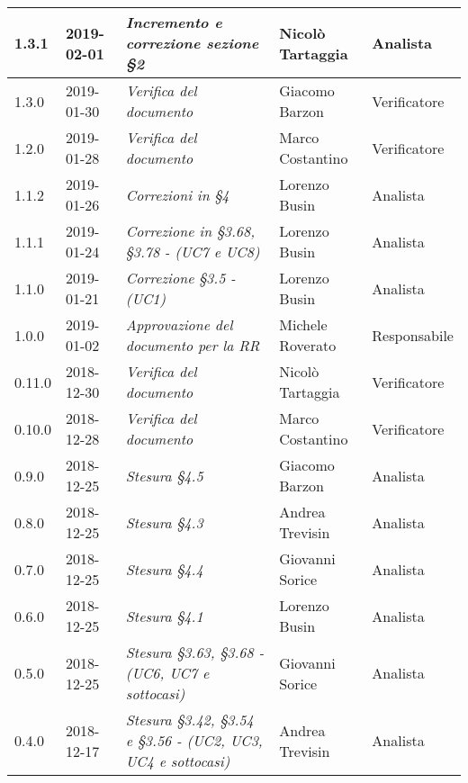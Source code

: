 \begin{longtable}{C{2cm}|C{2.5cm}|C{4.5cm}|C{2.5cm}|C{3cm}}
		1.3.1 & 2019-02-01 & \emph{Incremento e correzione sezione §2} & Nicolò Tartaggia & Analista \\
		\hline
	
		1.3.0 & 2019-01-30 & \emph{Verifica del documento} & Giacomo Barzon & Verificatore \\
		\hline
		
		1.2.0 & 2019-01-28 & \emph{Verifica del documento} & Marco Costantino & Verificatore \\
		\hline
	
		1.1.2 & 2019-01-26 & \emph{Correzioni in §4} & Lorenzo Busin & Analista \\
		\hline
	
		1.1.1 & 2019-01-24 & \emph{Correzione in §3.68, §3.78 - (UC7 e UC8)} & Lorenzo Busin & Analista \\
		\hline	
	
		1.1.0 & 2019-01-21 & \emph{Correzione §3.5 - (UC1)} & Lorenzo Busin & Analista \\
		\hline
		
		1.0.0 & 2019-01-02 & \emph{Approvazione del documento per la RR} & Michele Roverato & Responsabile \\
		\hline
		
		0.11.0 & 2018-12-30 & \emph{Verifica del documento} & Nicolò Tartaggia & Verificatore \\
		\hline
		
		0.10.0 & 2018-12-28 & \emph{Verifica del documento} & Marco Costantino & Verificatore \\
		\hline
		
		0.9.0 & 2018-12-25 & \emph{Stesura §4.5} & Giacomo Barzon & Analista \\
		\hline
		
		0.8.0 & 2018-12-25 & \emph{Stesura §4.3} & Andrea Trevisin & Analista \\
		\hline
		
		0.7.0 & 2018-12-25 & \emph{Stesura §4.4} & Giovanni Sorice & Analista \\
		\hline
		
		0.6.0 & 2018-12-25 & \emph{Stesura §4.1} & Lorenzo Busin & Analista \\
		\hline
		
		0.5.0 & 2018-12-25 & \emph{Stesura §3.63, §3.68 - (UC6, UC7 e sottocasi)} & Giovanni Sorice & Analista \\
		\hline
		
		0.4.0 & 2018-12-17 & \emph{Stesura §3.42, §3.54 e §3.56 - (UC2, UC3, UC4 e sottocasi)} & Andrea Trevisin & Analista \\
		\hline
		

\end{longtable}

